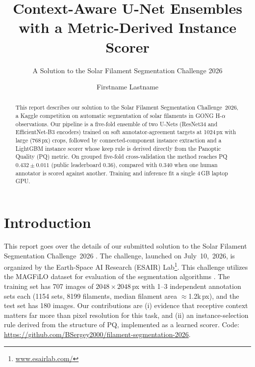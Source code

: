\documentclass[sigconf]{acmart}
\begin{document}
\title{Context-Aware U-Net Ensembles with a Metric-Derived Instance Scorer}
\subtitle{A Solution to the Solar Filament Segmentation Challenge 2026} %


\author{Firstname Lastname}  %

\begin{abstract}
    This report describes our solution to the Solar Filament Segmentation Challenge~2026, a Kaggle competition on automatic segmentation of solar filaments in GONG H-$\alpha$ observations. Our pipeline is a five-fold ensemble of two U-Nets (ResNet34 and EfficientNet-B3 encoders) trained on soft annotator-agreement targets at 1024\,px with large (768\,px) crops, followed by connected-component instance extraction and a LightGBM instance scorer whose keep rule is derived directly from the Panoptic Quality (PQ) metric. On grouped five-fold cross-validation the method reaches PQ\,$0.432\pm0.011$ (public leaderboard 0.36), compared with 0.340 when one human annotator is scored against another. Training and inference fit a single 4\,GB laptop GPU.
\end{abstract}

\maketitle

\ifguideStyle
{}
\par\medskip
\fi


\section{Introduction}
    This report goes over the details of our submitted solution to the Solar Filament Segmentation Challenge~2026 \cite{filament-segmentation-2026}. The challenge, launched on July~10,~2026, is organized by the Earth-Space AI Research (ESAIR) Lab\footnote{\href{https://www.esairlab.com/home}{www.esairlab.com/}}. This challenge utilizes the MAGFiLO dataset for evaluation of the segmentation algorithms \cite{ahmadzadeh2024dataset}. The training set has 707 images of $2048\times2048$\,px with 1--3 independent annotation sets each (1154 sets, 8199 filaments, median filament area $\approx$1.2k\,px), and the test set has 180 images. Our contributions are (i) evidence that receptive context matters far more than pixel resolution for this task, and (ii) an instance-selection rule derived from the structure of PQ, implemented as a learned scorer. Code: \url{https://github.com/BSergey2000/filament-segmentation-2026}.
\end{document}
